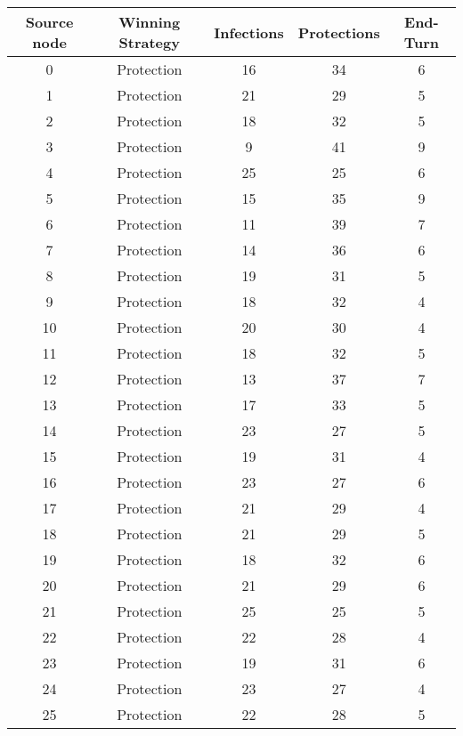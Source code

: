 \documentclass[results.tex]{subfiles}
\begin{document}
\begin{center}
  \begin{tabular}{| c || c | c | c | c |}
    \hline
    {\bfseries Source node} & {\bfseries Winning Strategy} & {\bfseries Infections} & {\bfseries Protections} & {\bfseries End-Turn} \\  %
    \hline\hline
    0 & Protection & 16 & 34 & 6 \\ 
    \hline
    1 & Protection & 21 & 29 & 5 \\ 
    \hline
    2 & Protection & 18 & 32 & 5 \\ 
    \hline
    3 & Protection & 9 & 41 & 9 \\ 
    \hline
    4 & Protection & 25 & 25 & 6 \\ 
    \hline
    5 & Protection & 15 & 35 & 9 \\ 
    \hline
    6 & Protection & 11 & 39 & 7 \\ 
    \hline
    7 & Protection & 14 & 36 & 6 \\ 
    \hline
    8 & Protection & 19 & 31 & 5 \\ 
    \hline
    9 & Protection & 18 & 32 & 4 \\ 
    \hline
    10 & Protection & 20 & 30 & 4 \\ 
    \hline
    11 & Protection & 18 & 32 & 5 \\ 
    \hline
    12 & Protection & 13 & 37 & 7 \\ 
    \hline
    13 & Protection & 17 & 33 & 5 \\ 
    \hline
    14 & Protection & 23 & 27 & 5 \\ 
    \hline
    15 & Protection & 19 & 31 & 4 \\ 
    \hline
    16 & Protection & 23 & 27 & 6 \\ 
    \hline
    17 & Protection & 21 & 29 & 4 \\ 
    \hline
    18 & Protection & 21 & 29 & 5 \\ 
    \hline
    19 & Protection & 18 & 32 & 6 \\ 
    \hline
    20 & Protection & 21 & 29 & 6 \\ 
    \hline
    21 & Protection & 25 & 25 & 5 \\ 
    \hline
    22 & Protection & 22 & 28 & 4 \\ 
    \hline
    23 & Protection & 19 & 31 & 6 \\ 
    \hline
    24 & Protection & 23 & 27 & 4 \\ 
    \hline
    25 & Protection & 22 & 28 & 5 \\ 

\end{tabular}
\end{center}
\end{document}

